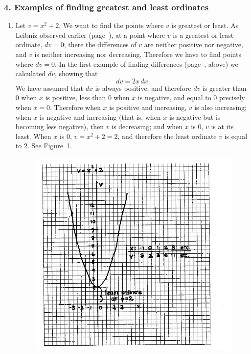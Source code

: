 \documentclass[polutonikogreek,english,twoside,openright]{article}
\begin{document}
\subsubsection*{4. Examples of finding greatest and least ordinates}
\begin{enumerate}
\item Let $v = x^2 + 2.$ We want to find the points where $v$ is
  greatest or least.  As Leibniz observed earlier
  (page~\pageref{dvzero}), at a point where $v$ is a greatest or least
  ordinate, $dv=0$; there the differences of $v$ are neither positive
  nor negative, and $v$ is neither increasing nor decreasing.
  Therefore we have to find points where $dv =0$.  In the first
  example of finding differences (page~\pageref{ex1}, above) we
  calculated $dv$, showing that
$$dv = 2x\,dx.$$
We have assumed that $dx$ is always positive, and therefore $dv$ is
greater than 0 when $x$ is positive, less than 0 when $x$ is negative,
and equal to 0 precisely when $x =0$.  Therefore when $x$ is positive
and increasing, $v$ is also increasing; when $x$ is negative and
increasing (that is, when $x$ is negative but is becoming less
negative), then $v$ is decreasing; and when $x$ is 0, $v$ is at its
least.  When $x$ is 0, $v = x^2 + 2 =2$, and therefore the least
ordinate $v$ is equal to 2. See Figure~\ref{glex1}.
\begin{figure}[htp]
\begin{center}
\includegraphics[width=\textwidth]{fig/Figure14}
\caption{}
\label{glex1}
\vspace{-10pt}
\end{center}
\end{figure}


\end{enumerate}
\end{document}
